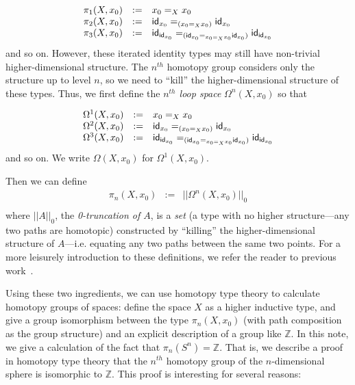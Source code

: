 \[
\begin{array}{rcl}
\pi_1(X,x_0) & := & x_0 =_X x_0 \\
\pi_2(X,x_0) & := & \mathsf{id}_{{x_0}} =_{{(x_0 =_X x_0)}} \mathsf{id}_{{x_0}} \\
\pi_3(X,x_0) & := & \mathsf{id}_{{\mathsf{id}_{x_0}}} =_{(\mathsf{id}_{{x_0}} =_{{x_0 =_X x_0}} \mathsf{id}_{{x_0}})} \mathsf{id}_{{\mathsf{id}_{x_0}}} \\
\end{array}
\]
and so on.  However, these iterated identity types may still have
non-trivial higher-dimensional structure.  The $n^{th}$ homotopy group
considers only the structure up to level $n$, so we need to ``kill'' the
higher-dimensional structure of these types.  Thus, we first define the
\emph{$n^{th}$ loop space} $\Omega^n(X,x_0)$ so that

\[
\begin{array}{rcl}
\Omega^1(X,x_0) & := & x_0 =_X x_0 \\
\Omega^2(X,x_0) & := & \mathsf{id}_{{x_0}} =_{{(x_0 =_X x_0)}} \mathsf{id}_{{x_0}} \\
\Omega^3(X,x_0) & := & \mathsf{id}_{{\mathsf{id}_{x_0}}} =_{(\mathsf{id}_{{x_0}} =_{{x_0 =_X x_0}} \mathsf{id}_{{x_0}})} \mathsf{id}_{{\mathsf{id}_{x_0}}} \\
\end{array}
\]
and so on.  We write $\Omega(X,x_0)$ for $\Omega^1(X,x_0)$.  

Then we can define 
\[
\begin{array}{rcl}
\pi_n(X,x_0) & := & ||\Omega^n(X,x_0)||_0 \\
\end{array}
\]
where $||A||_0$, the \emph{0-truncation of $A$}, is a \emph{set} (a type
with no higher structure---any two paths are homotopic) constructed by
``killing'' the higher-dimensional structure of $A$---i.e. equating any
two paths between the same two points.  For a more leisurely
introduction to these definitions, we refer the reader to previous work~\citep{ls13pi1s1,uf13hott-book}.

Using these two ingredients, we can use homotopy type theory to
calculate homotopy groups of spaces:
define the space $X$ as a
higher inductive type, and give
a group isomorphism between the type $\pi_n(X,x_0)$ (with path
composition as the group structure) and an explicit description of a
group like $\mathbb{Z}$.  In this note, we give a calculation of the
fact that $\pi_n(S^n) = \mathbb{Z}$. That is, we describe a proof in
homotopy type theory that the $n^{th}$ homotopy group of the
$n$-dimensional sphere is isomorphic to $\mathbb{Z}$.  This proof is
interesting for several reasons:

